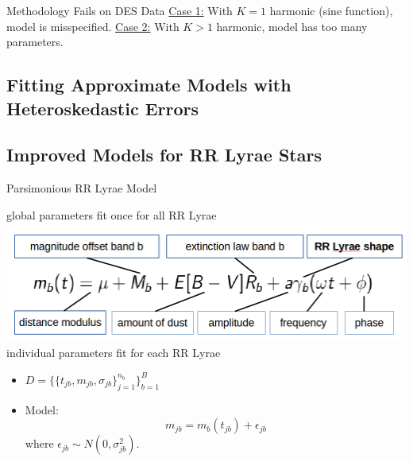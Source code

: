 \documentclass[12pt]{beamer}
\begin{document}




\begin{frame}{Methodology Fails on DES Data}
  \underline{Case 1:} With $K=1$ harmonic (sine function), model is misspecified.
  \underline{Case 2:} With $K>1$ harmonic, model has too many parameters.
\end{frame}




\subsection{Fitting Approximate Models with Heteroskedastic Errors}


\subsection{Improved Models for RR Lyrae Stars}

\begin{frame}{Parsimonious RR Lyrae Model}


\begin{center}
global parameters fit once for all RR Lyrae\\
\includegraphics[scale=.3]{figs/model.png}\\
individual parameters fit for each RR Lyrae
\end{center}

\vspace{.2in}

\begin{itemize}
\item $D=\{\{t_{jb},m_{jb},\sigma_{jb}\}_{j=1}^{n_b}\}_{b=1}^B$
\item Model:
\begin{equation*}
m_{jb} = m_b(t_{jb}) + \epsilon_{jb}
\end{equation*}
where $\epsilon_{jb} \sim N(0,\sigma_{jb}^2)$.
\end{itemize}
\end{frame}
\end{document}
